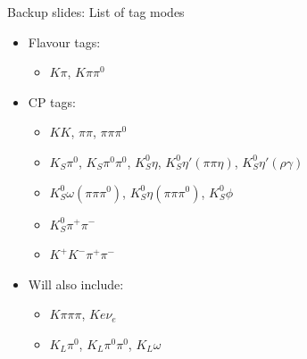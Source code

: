 \documentclass{beamer}
\begin{document}
\begin{frame}{Backup slides: List of tag modes}
  \begin{itemize}
    \item{Flavour tags:}
    \begin{itemize}
      \item{$K\pi$, $K\pi\pi^0$}
    \end{itemize}
    \item{CP tags}:
    \begin{itemize}
      \item{$KK$, $\pi\pi$, $\pi\pi\pi^0$}
      \item{$K_S\pi^0$, $K_S\pi^0\pi^0$, $K_S^0\eta$, $K_S^0\eta'(\pi\pi\eta)$, $K_S^0\eta'(\rho\gamma)$}
      \item{$K_S^0\omega(\pi\pi\pi^0)$, $K_S^0\eta(\pi\pi\pi^0)$, $K_S^0\phi$}
    \end{itemize}
    \begin{itemize}
      \item{$K_S^0\pi^+\pi^-$}
      \item{$K^+K^-\pi^+\pi^-$}
    \end{itemize}
    \item{Will also include:}
    \begin{itemize}
      \item{$K\pi\pi\pi$, $Ke\nu_e$}
      \item{$K_L\pi^0$, $K_L\pi^0\pi^0$, $K_L\omega$}
    \end{itemize}
  \end{itemize}
\end{frame}
\end{document}
